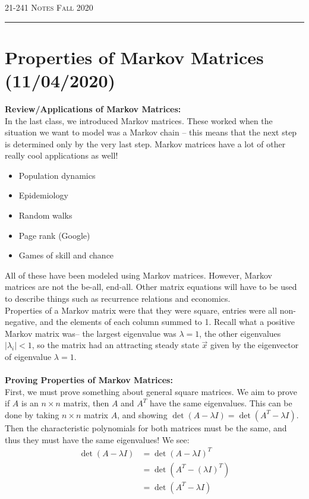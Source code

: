 \documentclass[12pt]{amsart}
\begin{document}
\thispagestyle{empty}

{\scshape 21-241} \hfill {\scshape \Large Notes} \hfill {\scshape Fall 2020}
\medskip
\hrule
\bigskip

\section*{Properties of Markov Matrices (11/04/2020)}
\textbf{Review/Applications of Markov Matrices:}\\
In the last class, we introduced Markov matrices. These worked when the situation we want to model was a Markov chain -- this means that the next step is determined only by the very last step. Markov matrices have a lot of other really cool applications as well!
\begin{itemize}
	\item Population dynamics
	\item Epidemiology
	\item Random walks
	\item Page rank (Google)
	\item Games of skill and chance
\end{itemize}
All of these have been modeled using Markov matrices. However, Markov matrices are not the be-all, end-all. Other matrix equations will have to be used to describe things such as recurrence relations and economics.\\
Properties of a Markov matrix were that they were square, entries were all non-negative, and the elements of each column summed to 1. Recall what a positive Markov matrix was-- the largest eigenvalue was $\lambda = 1$, the other eigenvalues $|\lambda_i| < 1$, so the matrix had an attracting steady state $\vec{x}$ given by the eigenvector of eigenvalue $\lambda=1$.\\
\\
\textbf{Proving Properties of Markov Matrices:}\\
First, we must prove something about general square matrices. We aim to prove if $A$ is an $n \times n$ matrix, then $A$ and $A^T$ have the same eigenvalues. This can be done by taking $n \times n$ matrix $A$, and showing $\det(A - \lambda I) = \det(A^T - \lambda I)$. Then the characteristic polynomials for both matrices must be the same, and thus they must have the same eigenvalues! We see:
\begin{align*}
	\det(A - \lambda I) &= \det(A - \lambda I)^T\\
						&= \det(A^T - (\lambda I)^T)\\
						&= \det(A^T - \lambda I)
\end{align*}
\end{document}
